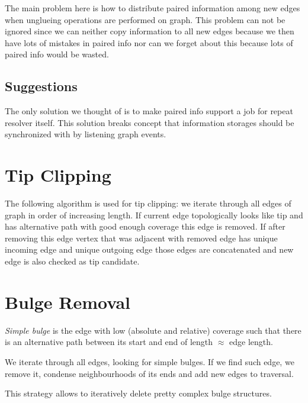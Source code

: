 \documentclass[14pt]{article}
\begin{document}
The main problem here is how to distribute paired information among new edges when unglueing operations are performed on graph. This problem can not be ignored since we can neither copy information to all new edges because we then have lots of mistakes in paired info nor can we forget about this because lots of paired info would be wasted.

\subsection{Suggestions}

The only solution we thought of is to make paired info support a job for repeat resolver itself. This solution breaks concept that information storages should be synchronized with by listening graph events.

\section{Tip Clipping}

The following algorithm is used for tip clipping: we iterate through all edges of graph in order of increasing length. If current edge topologically looks like tip and has alternative path with good enough coverage this edge is removed. If after removing this edge vertex that was adjacent with removed edge has unique incoming edge and unique outgoing edge those edges are concatenated and new edge is also checked as tip candidate.

\section{Bulge Removal}
\textit{Simple bulge} is the edge with low (absolute and relative) coverage such that there is an alternative path between its start and end of length $\approx$ edge length.

We iterate through all edges, looking for simple bulges. If we find such edge, we remove it, condense neighbourhoods of its ends and add new edges to traversal.

This strategy allows to iteratively delete pretty complex bulge structures.
\end{document}
